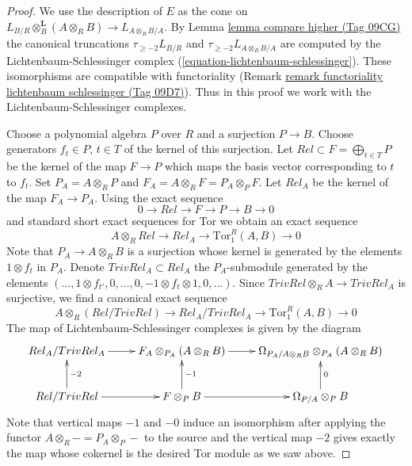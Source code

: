 \documentclass{amsart}
\theoremstyle{plain}
\theoremstyle{definition}
\theoremstyle{remark}
\numberwithin{equation}{subsection}
\begin{document}
\begin{proof}
We use the description of $E$ as the cone on
$L_{B/R} \otimes_B^\mathbf{L} (A \otimes_R B) \to L_{A \otimes_R B/A}$.
By Lemma \href{https://stacks.math.columbia.edu/tag/09CG}{lemma compare higher (Tag 09CG)} the canonical truncations
$\tau_{\geq -2}L_{B/R}$ and $\tau_{\geq -2}L_{A \otimes_R B/A}$
are computed by the Lichtenbaum-Schlessinger complex
(\ref{equation-lichtenbaum-schlessinger}).
These isomorphisms are compatible with functoriality
(Remark \href{https://stacks.math.columbia.edu/tag/09D7}{remark functoriality lichtenbaum schlessinger (Tag 09D7)}).
Thus in this proof we work with the Lichtenbaum-Schlessinger complexes.

\medskip\noindent
Choose a polynomial algebra $P$ over $R$ and a surjection $P \to B$.
Choose generators $f_t \in P$, $t \in T$ of the kernel of this surjection.
Let $Rel \subset F = \bigoplus_{t \in T} P$ be the kernel of the map
$F \to P$ which maps the basis vector corresponding to $t$ to $f_t$.
Set $P_A = A \otimes_R P$ and $F_A = A \otimes_R F = P_A \otimes_P F$.
Let $Rel_A$ be the kernel of the map $F_A \to P_A$. Using the exact sequence
$$
0 \to Rel \to F \to P \to B \to 0
$$
and standard short exact sequences for Tor we obtain an exact sequence
$$
A \otimes_R Rel \to Rel_A \to \text{Tor}_1^R(A, B) \to 0
$$
Note that $P_A \to A \otimes_R B$ is a surjection whose kernel is generated
by the elements $1 \otimes f_t$ in $P_A$. Denote $TrivRel_A \subset Rel_A$
the $P_A$-submodule generated by the elements
$(\ldots, 1 \otimes f_{t'}, 0, \ldots,
0, - 1 \otimes f_t \otimes 1, 0, \ldots)$.
Since $TrivRel \otimes_R A \to TrivRel_A$ is surjective, we find a
canonical exact sequence
$$
A \otimes_R (Rel/TrivRel) \to Rel_A/TrivRel_A \to \text{Tor}_1^R(A, B) \to 0
$$
The map of Lichtenbaum-Schlessinger complexes is given by the diagram
$$
\xymatrix{
Rel_A/TrivRel_A \ar[r] &
F_A \otimes_{P_A} (A \otimes_R B) \ar[r] &
\Omega_{P_A/A \otimes_R B} \otimes_{P_A} (A \otimes_R B) \\
Rel/TrivRel \ar[r] \ar[u]_{-2} &
F \otimes_P B \ar[r] \ar[u]_{-1} &
\Omega_{P/A} \otimes_P B \ar[u]_0
}
$$
Note that vertical maps $-1$ and $-0$ induce an isomorphism after applying
the functor $A \otimes_R - = P_A \otimes_P -$ to the source and the vertical
map $-2$ gives exactly the map whose cokernel is the desired Tor module
as we saw above.
\end{proof}
\end{document}

